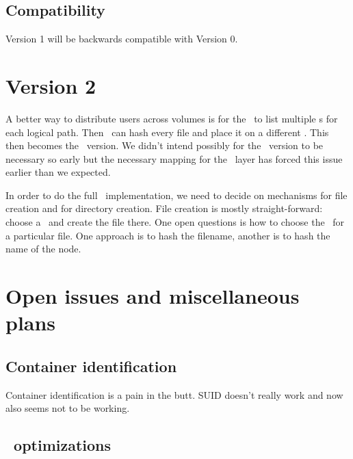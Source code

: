 \documentclass[10pt]{article}
\begin{document}
\subsection{Compatibility}

Version 1 will be backwards compatible with Version 0.

\section{Version 2}

A better way to distribute users across volumes is for the \plfsrc\ to list
multiple {\store}s for each logical path.  Then \plfs\ can hash every file
and place it on a different \store.  This then becomes the \mds\ version.
We didn't intend possibly for the \mds\ version to be necessary so early
but the necessary mapping for the \adio\ layer has forced this issue earlier
than we expected.

In order to do the full \mds\ implementation, we need to decide on mechanisms
for file creation and for directory creation.  File creation is mostly
straight-forward: choose a \store\ and create the file there.  One open
questions is how to choose the \store\ for a particular file.  One approach
is to hash the filename, another is to hash the name of the node.

\section{Open issues and miscellaneous plans}

\subsection{Container identification}

Container identification is a pain in the butt.  SUID doesn't really work
and now  also seems not to be working.

\subsection{\adio\ optimizations}
\end{document}

